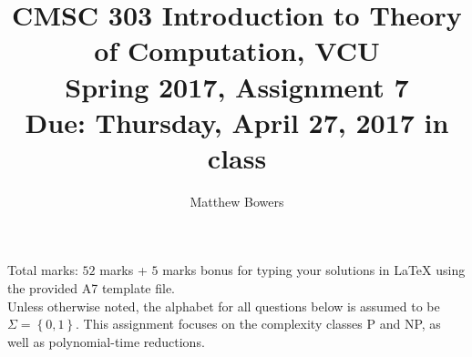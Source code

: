 \documentclass{article}
\author{Matthew Bowers}
\newcommand{\set}[1]{{\left\{#1\right\}}}    %
\begin{document}
\title{CMSC 303 Introduction to Theory of Computation, VCU\\Spring 2017, Assignment 7\\Due: Thursday, April 27, 2017 in class}
\date{}
\maketitle

\vspace{-5mm}
\noindent Total marks: $52$ marks + $5$ marks bonus for typing your solutions in LaTeX using the provided A7 template file.\vspace{2mm}\\

\noindent Unless otherwise noted, the alphabet for all questions below is assumed to be $\Sigma=\set{0,1}$. This assignment focuses on the complexity classes P and NP, as well as polynomial-time reductions.
\end{document}
